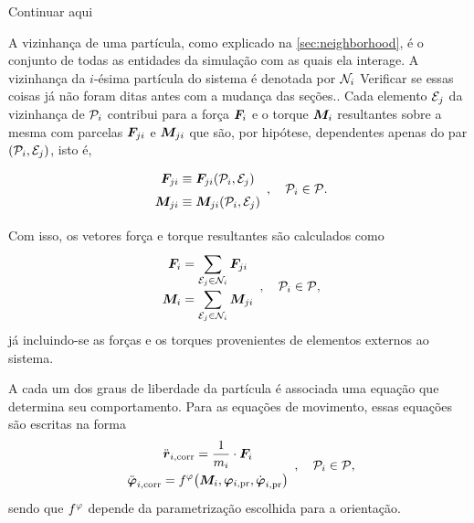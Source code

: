 \alert{Continuar aqui }

A vizinhança de uma partícula, como explicado na \autoref{sec:neighborhood}, é o conjunto de todas as entidades da simulação com as quais ela interage. A vizinhança da \(i\)-ésima partícula do sistema é denotada por \({\mathcal{N}}_{i}\) \alert{Verificar se essas coisas já não foram ditas antes com a mudança das seções.}. Cada elemento \({\mathcal{E}}_{j}\) da vizinhança de \(\particlei\) contribui para a força \({\bm{F}}_{i}\) e o torque \({\bm{M}}_{i}\) resultantes sobre a mesma com parcelas \({\bm{F}}_{j i}\) e \({\bm{M}}_{j i}\) que são, por hipótese, dependentes apenas do par \(\orderedPair{\particlei}{\elementj}\), isto é,
\begin{equation*}
	\def\arraystretch{1.5}
	\begin{array}{c}
		\displaystyle \forceji \equiv \forceji\pqty{\particlei, \elementj} \\
		\displaystyle \torqueji \equiv \torqueji\pqty{\particlei, \elementj} \\
	\end{array}, \quad \particlei \in \particleSet.
\end{equation*}

Com isso, os vetores força e torque resultantes são calculados como
\begin{equation*}
	\def\arraystretch{1.5}
	\begin{array}{c}
		\displaystyle \forcei = \sum_{\elementj\in\neighborhoodi} \forceji \\
		\displaystyle \torquei = \sum_{\elementj\in\neighborhoodi} \torqueji 
	\end{array}, \quad \particlei \in \particleSet,
\end{equation*}
já incluindo-se as forças e os torques provenientes de elementos externos ao sistema.

A cada um dos graus de liberdade da partícula é associada uma equação que determina seu comportamento. Para as equações de movimento, essas equações são escritas na forma
\begin{equation*}
	\def\arraystretch{1.5}
	\begin{array}{c}
		\displaystyle \accelerationicorr =  \dfrac{1}{\massi}\cdot \forcei \\
		\displaystyle \dorientationicorr{2} = \eqFor{\orientationScalar}\pqty{\torquei, \orientationipr, \dorientationipr{1}}
	\end{array}, \quad \particlei \in \particleSet,
\end{equation*}
sendo que \(f^{\varphi}\) depende da parametrização escolhida para a orientação.

